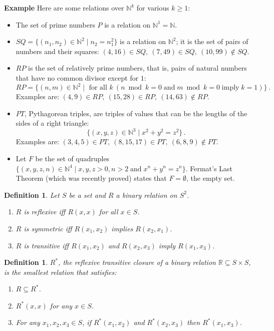\documentclass[12pt,a4paper]{article}
\newtheorem{definition}[theorem]{Definition}
\newcommand*{\comma}{,\:}
\newenvironment{example}{\textbf{Example}}{}
\begin{document}
\begin{example}
Here are some relations over $\mathbb{N}^k$ for various $k\ge 1$:
\begin{itemize}
\item The set of prime numbers $P$ is a relation on
$\mathbb{N}^1=\mathbb{N}$.

\item
$SQ = \{(n_1,n_2)\in \mathbb{N}^2\mid n_2=n_1^2\}$ is a relation on
$\mathbb{N}^2$; it is the set of pairs of numbers and their squares:
$(4,16)\in SQ\comma (7,49)\in SQ\comma (10,99)\not \in SQ$.

\item $RP$ is the set of relatively prime numbers, that is, pairs of natural numbers that have no common divisor except for $1$:
\[
RP = \{(n,m)\in \mathbb{N}^2\mid \textrm{\ for all\ }k\: (n \bmod k = 0 \;\textrm{and}\;m \bmod k = 0 \;\textrm{imply}\; k = 1)\}\,.
\]
Examples are:
$(4,9)\in RP\comma (15,28) \in RP\comma (14,63)\not\in RP$.

\item $PT$, Pythagorean triples, are triples of values that can be the lengths of the sides of a right triangle:
\[
\{(x,y,z) \in \mathbb{N}^3\mid x^{2}+y^{2}=z^{2}\}\,.
\]
Examples are: $(3,4,5)\in PT\comma (8,15,17)\in PT\comma (6,8,9)\not\in PT$.
 
\item Let $F$ be the set of quadruples $\{(x,y,z,n)\in \mathbb{N}^4\mid x,y,z>0, n>2 \;\textrm{and}\; x^{n}+y^{n}=z^{n}\}$. Fermat's Last Theorem (which was recently proved) states that $F=\emptyset$, the empty set.
\end{itemize}
\end{example}

\begin{definition}\label{def.reflextrans}
Let $S$ be a set and $R$ a binary relation on $S^{2}$.
\begin{enumerate}
\item $R$ is \emph{reflexive} iff $R(x,x)$ for all $x\in S$.
\item $R$ is \emph{symmetric} iff $R(x_{1},x_{2})$ implies
$R(x_{2},x_{1})$.
\item $R$ is \emph{transitive} iff $R(x_{1},x_{2})$ and $R(x_{2},x_{3})$
imply $R(x_{1},x_{3})$.
\end{enumerate}
\end{definition}

\begin{definition}
$R^{*}$, the \emph{reflexive transitive closure of a binary relation $\mathbb{R}\subseteq S\times S$},
 is the smallest relation that satisfies:
\begin{enumerate}
\item $R\subseteq R^{*}$.
\item $R^{*}(x,x)$ for any $x\in S$.
\item For any $x_1,x_2,x_3\in S$, if $R^{*}(x_{1},x_{2})$ and
$R^{*}(x_{2},x_{3})$ then $R^{*}(x_{1},x_{3})$.
\end{enumerate}
\end{definition}
\end{document}
